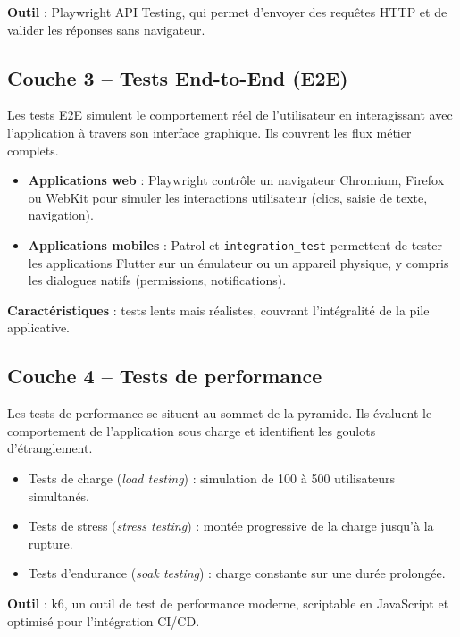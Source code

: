 \textbf{Outil} : Playwright API Testing, qui permet d'envoyer des requêtes HTTP et de valider les réponses sans navigateur.

\subsection{Couche 3 -- Tests End-to-End (E2E)}
\label{subsec:tests-e2e}

Les tests E2E simulent le comportement réel de l'utilisateur en interagissant avec l'application à travers son interface graphique. Ils couvrent les flux métier complets.

\begin{itemize}[nosep]
    \item \textbf{Applications web} : Playwright contrôle un navigateur Chromium, Firefox ou WebKit pour simuler les interactions utilisateur (clics, saisie de texte, navigation).
    \item \textbf{Applications mobiles} : Patrol et \texttt{integration\_test} permettent de tester les applications Flutter sur un émulateur ou un appareil physique, y compris les dialogues natifs (permissions, notifications).
\end{itemize}

\textbf{Caractéristiques} : tests lents mais réalistes, couvrant l'intégralité de la pile applicative.

\subsection{Couche 4 -- Tests de performance}
\label{subsec:tests-performance}

Les tests de performance se situent au sommet de la pyramide. Ils évaluent le comportement de l'application sous charge et identifient les goulots d'étranglement.

\begin{itemize}[nosep]
    \item Tests de charge (\textit{load testing}) : simulation de 100 à 500 utilisateurs simultanés.
    \item Tests de stress (\textit{stress testing}) : montée progressive de la charge jusqu'à la rupture.
    \item Tests d'endurance (\textit{soak testing}) : charge constante sur une durée prolongée.
\end{itemize}

\textbf{Outil} : k6, un outil de test de performance moderne, scriptable en JavaScript et optimisé pour l'intégration CI/CD.

